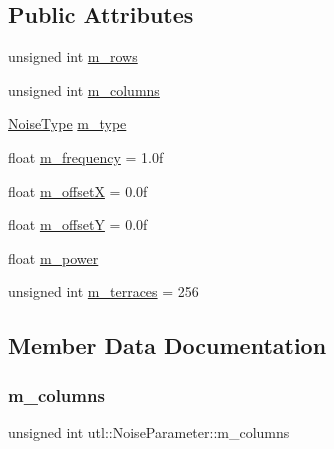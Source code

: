 \subsection*{Public Attributes}
\begin{DoxyCompactItemize}
\item 
unsigned int \mbox{\hyperlink{structutl_1_1_noise_parameter_a77a93ea6f3219eb102f7caad03add0d8}{m\+\_\+rows}}
\item 
unsigned int \mbox{\hyperlink{structutl_1_1_noise_parameter_ac8ce81ec414d011e6ab4c9b4396b1bca}{m\+\_\+columns}}
\item 
\mbox{\hyperlink{namespaceutl_a42b249122648f147a9f518c8661cc8d2}{Noise\+Type}} \mbox{\hyperlink{structutl_1_1_noise_parameter_a73630ba68ef9be199087fdeeb4d58313}{m\+\_\+type}}
\item 
float \mbox{\hyperlink{structutl_1_1_noise_parameter_a7e59b63b81caef35ec2fd220b92f4c41}{m\+\_\+frequency}} = 1.\+0f
\item 
float \mbox{\hyperlink{structutl_1_1_noise_parameter_a14b89739bf33703265d8efd7edf1f90b}{m\+\_\+offsetX}} = 0.\+0f
\item 
float \mbox{\hyperlink{structutl_1_1_noise_parameter_af74ed6d80ad4910e030dd52786b3e7b0}{m\+\_\+offsetY}} = 0.\+0f
\item 
float \mbox{\hyperlink{structutl_1_1_noise_parameter_a973e886fed351fe1dad1124466efef15}{m\+\_\+power}}
\item 
unsigned int \mbox{\hyperlink{structutl_1_1_noise_parameter_a7b54a4904b765e2c6a1c2cba64486706}{m\+\_\+terraces}} = 256
\end{DoxyCompactItemize}


\subsection{Member Data Documentation}
\mbox{\label{structutl_1_1_noise_parameter_ac8ce81ec414d011e6ab4c9b4396b1bca}} 
\subsubsection{\texorpdfstring{m\+\_\+columns}{m\_columns}}
{\footnotesize\ttfamily unsigned int utl\+::\+Noise\+Parameter\+::m\+\_\+columns}

\mbox{\label{structutl_1_1_noise_parameter_a7e59b63b81caef35ec2fd220b92f4c41}} 
